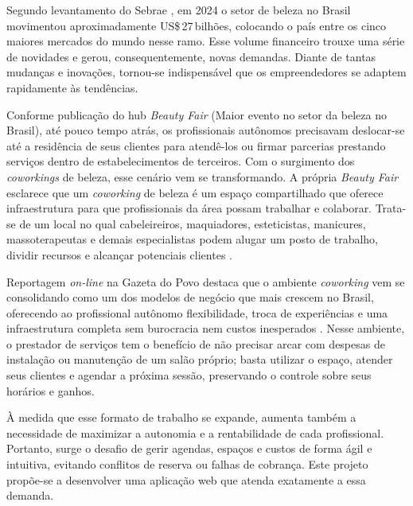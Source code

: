 
Segundo levantamento do Sebrae \cite{Sebrae_2024}
, em 2024 o setor de beleza no Brasil movimentou aproximadamente US\$\,27\,bilhões, colocando o país entre os cinco maiores mercados do mundo nesse ramo. Esse volume financeiro trouxe uma série de novidades e gerou, consequentemente, novas demandas. Diante de tantas mudanças e inovações, tornou-se indispensável que os empreendedores se adaptem rapidamente às tendências.

Conforme publicação do hub \emph{Beauty Fair} (Maior evento no setor da beleza no Brasil), até pouco tempo atrás, os profissionais autônomos precisavam deslocar-se até a residência de seus clientes para atendê-los ou firmar parcerias prestando serviços dentro de estabelecimentos de terceiros. Com o surgimento dos \emph{coworkings} de beleza, esse cenário vem se transformando. A própria \emph{Beauty Fair} esclarece que um \emph{coworking} de beleza é um espaço compartilhado que oferece infraestrutura para que profissionais da área possam trabalhar e colaborar. Trata-se de um local no qual cabeleireiros, maquiadores, esteticistas, manicures, massoterapeutas e demais especialistas podem alugar um posto de trabalho, dividir recursos e alcançar potenciais clientes \cite{BeautyFair}.

Reportagem \emph{on-line} na Gazeta do Povo destaca que o ambiente \emph{coworking} vem se consolidando como um dos modelos de negócio que mais crescem no Brasil, oferecendo ao profissional autônomo flexibilidade, troca de experiências e uma infraestrutura completa sem burocracia nem custos inesperados \cite{gazeta-coworking}. Nesse ambiente, o prestador de serviços tem o benefício de não precisar arcar com despesas de instalação ou manutenção de um salão próprio; basta utilizar o espaço, atender seus clientes e agendar a próxima sessão, preservando o controle sobre seus horários e ganhos.

À medida que esse formato de trabalho se expande, aumenta também a necessidade de maximizar a autonomia e a rentabilidade de cada profissional. Portanto, surge o desafio de gerir agendas, espaços e custos de forma ágil e intuitiva, evitando conflitos de reserva ou falhas de cobrança. Este projeto propõe-se a desenvolver uma aplicação web que atenda exatamente a essa demanda.





